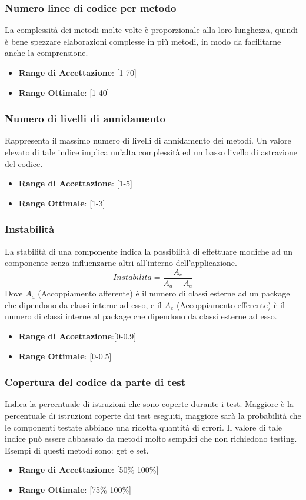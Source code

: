 \documentclass[12pt,a4paper]{article}
\begin{document}
\subsubsection{Numero linee di codice per metodo}
La complessità dei metodi molte volte è proporzionale alla loro lunghezza,
quindi è bene spezzare elaborazioni complesse in più metodi, in modo da facilitarne anche la comprensione.
\begin{itemize}
\item \textbf{Range di Accettazione}: [1-70]
\item \textbf{Range Ottimale}: [1-40]
\end{itemize}
\subsubsection{Numero di livelli di annidamento}
Rappresenta il massimo numero di livelli di annidamento dei metodi. Un valore elevato di tale indice implica un'alta complessità ed un basso livello di astrazione del codice.
\begin{itemize}
\item \textbf{Range di Accettazione}: [1-5]
\item \textbf{Range Ottimale}: [1-3]
\end{itemize}
\subsubsection{Instabilità}
La stabilità di una componente indica la possibilità di effettuare modiche ad un componente senza influenzarne altri all'interno dell'applicazione.
\[Instabilita=\frac{A_e}{A_a+A_e}\]
Dove $A_a$ (Accoppiamento afferente) è il numero di classi esterne ad un package che dipendono da classi interne ad esso, e il $A_e$ (Accoppiamento efferente) è il numero di classi interne al package che dipendono da classi esterne ad esso.
\begin{itemize}
\item \textbf{Range di Accettazione}:[0-0.9]
\item \textbf{Range Ottimale}: [0-0.5]
\end{itemize}
\subsubsection{Copertura del codice da parte di test}
Indica la percentuale di istruzioni che sono coperte durante i test. Maggiore è la percentuale di istruzioni coperte dai test eseguiti, maggiore sarà la probabilità che le componenti testate abbiano una ridotta quantità di errori. Il valore di tale indice può essere abbassato da metodi molto semplici che non richiedono testing. Esempi di questi metodi sono: get e set.
\begin{itemize}
\item \textbf{Range di Accettazione}: [50\%-100\%]
\item \textbf{Range Ottimale}: [75\%-100\%]
\end{itemize}
\newpage
\end{document}
